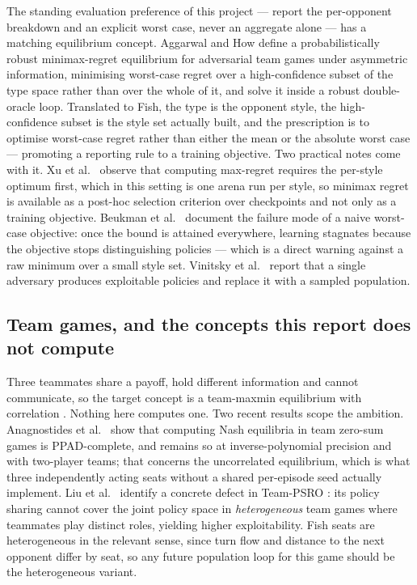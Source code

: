 \documentclass[11pt]{article}
\theoremstyle{definition}
\begin{document}
The standing evaluation preference of this project --- report the per-opponent
breakdown and an explicit worst case, never an aggregate alone --- has a matching
equilibrium concept. Aggarwal and How \cite{aggarwal-prmre} define a
probabilistically robust minimax-regret equilibrium for adversarial team games
under asymmetric information, minimising worst-case regret over a
high-confidence subset of the type space rather than over the whole of it, and
solve it inside a robust double-oracle loop. Translated to Fish, the type is the
opponent style, the high-confidence subset is the style set actually built, and
the prescription is to optimise worst-case regret rather than either the mean or
the absolute worst case --- promoting a reporting rule to a training objective.
Two practical notes come with it. Xu et al.\ \cite{xu-mirror} observe that
computing max-regret requires the per-style optimum first, which in this setting
is one arena run per style, so minimax regret is available as a post-hoc
selection criterion over checkpoints and not only as a training objective.
Beukman et al.\ \cite{beukman-remidi} document the failure mode of a naive
worst-case objective: once the bound is attained everywhere, learning stagnates
because the objective stops distinguishing policies --- which is a direct warning
against a raw minimum over a small style set. Vinitsky et al.\
\cite{vinitsky-rap} report that a single adversary produces exploitable policies
and replace it with a sampled population.

\subsection{Team games, and the concepts this report does not compute}

Three teammates share a payoff, hold different information and cannot
communicate, so the target concept is a team-maxmin equilibrium with correlation
\cite{celli-gatti}. Nothing here computes one. Two recent results scope the
ambition. Anagnostides et al.\ \cite{anagnostides-teamzero} show that computing
Nash equilibria in team zero-sum games is PPAD-complete, and remains so at
inverse-polynomial precision and with two-player teams; that concerns the
uncorrelated equilibrium, which is what three independently acting seats without
a shared per-episode seed actually implement. Liu et al.\ \cite{liu-hpsro}
identify a concrete defect in Team-PSRO \cite{mcaleer-teampsro}: its policy
sharing cannot cover the joint policy space in \emph{heterogeneous} team games
where teammates play distinct roles, yielding higher exploitability. Fish seats
are heterogeneous in the relevant sense, since turn flow and distance to the next
opponent differ by seat, so any future population loop for this game should be
the heterogeneous variant.
\end{document}

